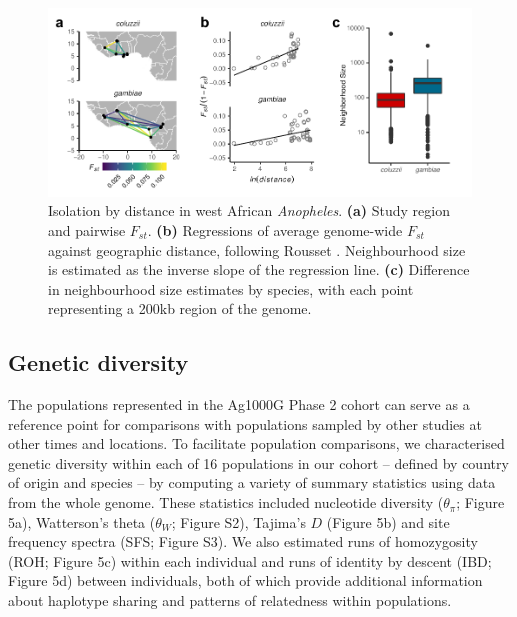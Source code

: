 \documentclass[a4paper,11pt,abstracton,hidelinks]{scrartcl}
\begin{document}
\begin{figure}[H]
	\begin{center}
		\includegraphics*[width=6.3in]{artwork/west_africa_multipanel_edit_NOD.pdf}
	\end{center}
	\caption{Isolation by distance in west African \textit{Anopheles}. \textbf{(a)} Study region and pairwise $F_{st}$. \textbf{(b)} Regressions of average genome-wide $F_{st}$ against geographic distance, following Rousset \cite{rousset1997}. Neighbourhood size is estimated as the inverse slope of the regression line. \textbf{(c)} Difference in neighbourhood size estimates by species, with each point representing a 200kb region of the genome.}
	\label{fig:ibd_fig}
\end{figure}


\subsection*{Genetic diversity}


%
The populations represented in the Ag1000G Phase 2 cohort can serve as a reference point for comparisons with populations sampled by other studies at other times and locations. 
%
To facilitate population comparisons, we characterised genetic diversity within each of 16 populations in our cohort -- defined by country of origin and species -- by computing a variety of summary statistics using data from the whole genome.
%
These statistics included nucleotide diversity ($\theta_{\pi}$; Figure 5a), Watterson's theta ($\theta_{W}$; Figure S2), Tajima's $D$ (Figure 5b) and site frequency spectra (SFS; Figure S3). 
%
We also estimated runs of homozygosity (ROH; Figure 5c) within each individual and runs of identity by descent (IBD; Figure 5d) between individuals, both of which provide additional information about haplotype sharing and patterns of relatedness within populations. 
\end{document}
